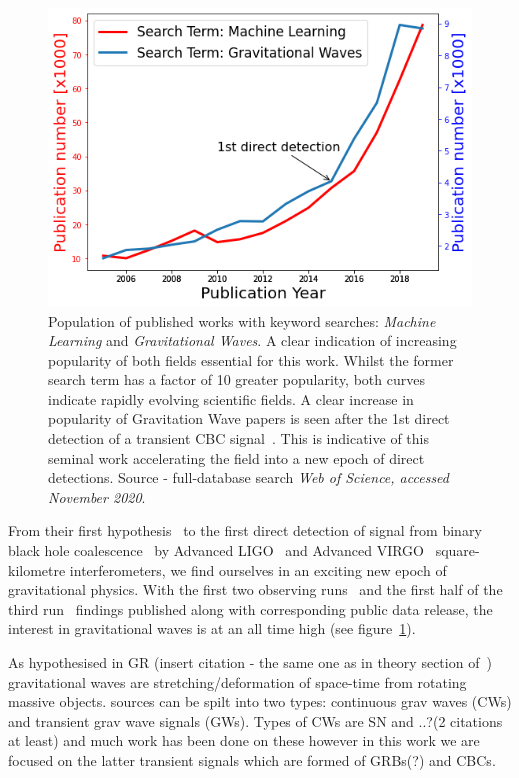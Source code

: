 \documentclass[11pt]{article}
\begin{document}
\begin{figure}[b!]
    \centering
    \includegraphics[width=.5\linewidth]{shared_resources/shared_figs/wos.png}
    \caption{Population of published works with keyword searches: \textit{Machine Learning} and \textit{Gravitational Waves}. A clear indication of increasing popularity of both fields essential for this work. Whilst the former search term has a factor of 10 greater popularity, both curves indicate rapidly evolving scientific fields. A clear increase in popularity of Gravitation Wave papers is seen after the 1st direct detection of a transient \ac{CBC} signal~\cite{abbott2016observation}. This is indicative of this seminal work accelerating the field into a new epoch of direct detections. Source \-- full-database search \textit{Web of Science, accessed November 2020}. }
    \label{fig:wos}
\end{figure}



From their first hypothesis~\cite{einstein1} to the first direct detection of signal from binary black hole coalescence~\cite{abbott2016observation} by Advanced LIGO~\cite{advancedLIGO} and Advanced VIRGO~\cite{advacnedVIRGO} square-kilometre interferometers, we find ourselves in an exciting new epoch of gravitational physics. With the first two observing runs~\cite{BBHo1,gwtc1} and the first half of the third run~\cite{gwtc2} findings published along with corresponding public data release, the interest in gravitational waves is at an all time high (see figure~\ref{fig:wos}). 

As hypothesised in GR (insert citation - the same one as in theory section of~\cite{abbott2016observation}) gravitational waves are stretching/deformation of space-time from rotating massive objects. sources can be spilt into two types: continuous grav waves (CWs) and transient grav wave signals (GWs). Types of CWs are SN and ..?(2 citations at least) and much work has been done on these however in this work we are focused on the latter transient signals which are formed of GRBs(?) and CBCs.
\end{document}
